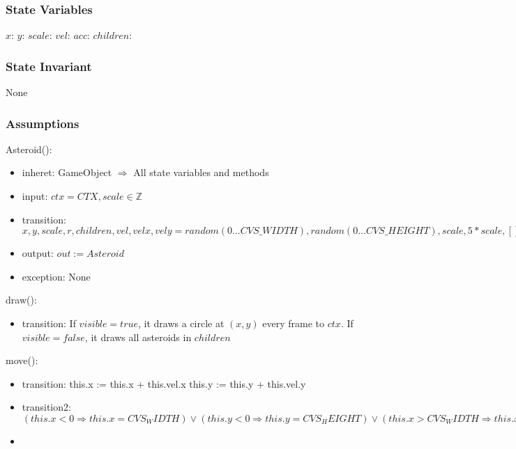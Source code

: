 \documentclass[12pt]{article}
\begin{document}
\subsubsection* {State Variables}

$x$:
$y$:
$scale$:
$vel$:
$acc$:
$children$:

\subsubsection* {State Invariant}

None

\subsubsection* {Assumptions}

Asteroid():
\begin{itemize}
    \item inheret: GameObject $\Rightarrow$ All state variables and methods
    \item input: $ctx = CTX, scale \in \mathbb{Z}$
    \item transition: $ x, y, scale, r, children, vel, velx, vely = random(0...CVS\_WIDTH), random(0...CVS\_HEIGHT),
    scale,
    5*scale,
    [],
    random(-1...1) * 3,
    random(-1...1) * 3$
    \item output: $out := Asteroid$
    \item exception: None
\end{itemize}

draw():
\begin{itemize}
  \item transition: If $visible = true$, it draws a circle at $(x,y)$ every frame to $ctx$. If $visible = false$, it draws all asteroids in $children$
\end{itemize}

move():
\begin{itemize}
  \item transition: this.x := this.x + this.vel.x \land this.y := this.y + this.vel.y
  \item transition2: $(this.x < 0 \Rightarrow this.x = CVS_WIDTH) \lor (this.y < 0 \Rightarrow this.y = CVS_HEIGHT) \lor (this.x > CVS_WIDTH \Rightarrow this.x = 0) \lor (this.y > CVS_HEIGHT \Rightarrow this.y = 0)$
  \item
\end{itemize}

\end{document}
